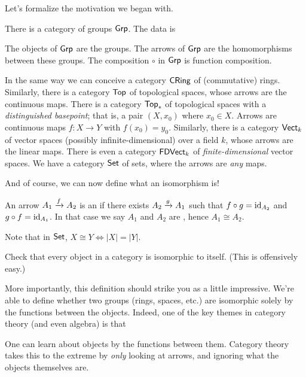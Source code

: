 Let's formalize the motivation we began with.
\begin{example}
	\listhack
	\label{example:basic_categories}
	\begin{enumerate}[(a)]
		\ii There is a category of groups $\mathsf{Grp}$. The data is
		\begin{itemize}
			\ii The objects of $\mathsf{Grp}$ are the groups.
			\ii The arrows of $\mathsf{Grp}$ are the homomorphisms between these groups.
			\ii The composition $\circ$ in $\mathsf{Grp}$ is function composition.
		\end{itemize}
		\ii In the same way we can conceive a category $\mathsf{CRing}$ of (commutative) rings.
		\ii Similarly, there is a category $\mathsf{Top}$ of topological spaces,
		whose arrows are the continuous maps.
		\ii There is a category $\mathsf{Top}_\ast$ of topological spaces with a \emph{distinguished basepoint};
		that is, a pair $(X, x_0)$ where $x_0 \in X$.
		Arrows are continuous maps $f : X \to Y$ with $f(x_0) = y_0$.
		\ii Similarly, there is a category $\mathsf{Vect}_k$ of
		vector spaces (possibly infinite-dimensional) over a field $k$,
		whose arrows are the linear maps.
		There is even a category $\mathsf{FDVect}_k$ of
		\emph{finite-dimensional} vector spaces.
		\ii We have a category $\mathsf{Set}$ of sets,
		where the arrows are \emph{any} maps.
	\end{enumerate}
\end{example}
And of course, we can now define what an isomorphism is!
\begin{definition}
	An arrow $A_1 \xrightarrow{f} A_2$ is an 
	if there exists $A_2 \xrightarrow{g} A_1$ such that $f \circ g = \mathrm{id}_{A_2}$
	and $g \circ f = \mathrm{id}_{A_1}$.
	In that case we say $A_1$ and $A_2$ are , hence $A_1 \cong A_2$.
\end{definition}
\begin{remark}
	Note that in $\mathsf{Set}$, $X \cong Y
	\iff \left\lvert X \right\rvert = \left\lvert Y \right\rvert$.
\end{remark}
\begin{ques}
	Check that every object in a category is isomorphic to itself.
	(This is offensively easy.)
\end{ques}
More importantly, this definition should strike you as a little impressive.
We're able to define whether two groups (rings, spaces, etc.) are isomorphic
solely by the functions between the objects.
Indeed, one of the key themes in category theory (and even algebra) is that
\begin{moral}
	One can learn about objects by the functions between them.
	Category theory takes this to the extreme by \emph{only} looking at arrows,
	and ignoring what the objects themselves are.
\end{moral}

